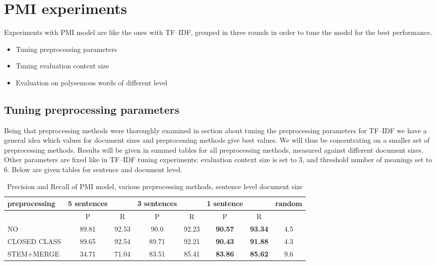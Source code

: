\section{PMI experiments} 
Experiments  with PMI model are like the ones with TF--IDF, grouped in three rounds in order to tune
the model for the best performance. 
\begin{itemize}
\item Tuning preprocessing parameters
\item Tuning evaluation context size
\item Evaluation on polysemous words of different level
\end{itemize}

\subsection{Tuning preprocessing parameters}
Being that preprocessing methods were thoroughly examined in section about tuning the preprocessing 
parameters for TF--IDF we have a general idea which values for document sizes and preprocessing 
methods give best values. We will thus be concentrating on a smaller set of preprocessing methods. 
Results will be given in summed tables for all preprocessing methods, measured against different 
document sizes.  Other parameters are fixed like in TF--IDF tuning experiments: 
evaluation context size is set to 3, and threshold number of meanings set to 6.
Below are given tables for sentence and document level. 
\begin{table}[h!]
\begin{tabular}{ l | c c | c c | c c | c}
   preprocessing &  5 sentences && 3 sentences && 1 sentence  && random\\
\hline
	& P  &  R & P  &  R & P  &  R &\\
\hline\hline
NO & 89.81  & 92.53  & 90.0  &  92.23 & \textbf{90.57}  & \textbf{93.34}  & 4.5  \\
CLOSED CLASS & 89.65  & 92.54  & 89.71  & 92.21  & \textbf{90.43}  & \textbf{91.88}  & 4.3  \\
STEM+MERGE & 34.71  & 71.04  & 83.51  & 85.41  & \textbf{83.86}  & \textbf{85.62} & 9.6  \\
\end{tabular}
\caption{Precision and Recall of PMI model, various preprocessing methods, sentence level document size}
\end{table}

